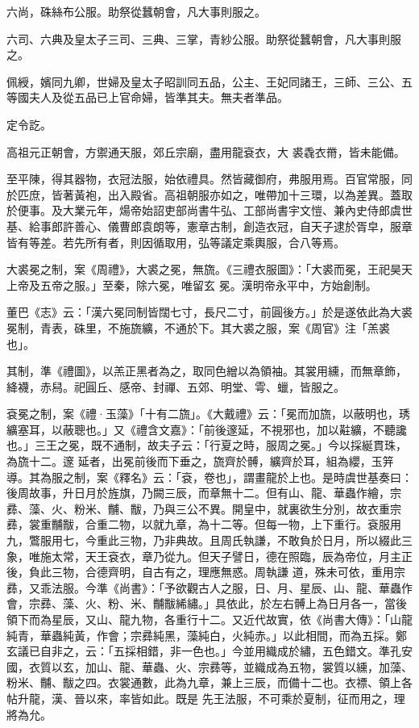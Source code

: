 \begin{pinyinscope}
 六尚，硃絲布公服。助祭從蠶朝會，凡大事則服之。



 六司、六典及皇太子三司、三典、三掌，青紗公服。助祭從蠶朝會，凡大事則服之。



 佩綬，嬪同九卿，世婦及皇太子昭訓同五品，公主、王妃同諸王，三師、三公、五等國夫人及從五品已上官命婦，皆準其夫。無夫者準品。



 定令訖。



 高祖元正朝會，方禦通天服，郊丘宗廟，盡用龍袞衣，大
 裘毳衣黹，皆未能備。



 至平陳，得其器物，衣冠法服，始依禮具。然皆藏御府，弗服用焉。百官常服，同於匹庶，皆著黃袍，出入殿省。高祖朝服亦如之，唯帶加十三環，以為差異。蓋取於便事。及大業元年，煬帝始詔吏部尚書牛弘、工部尚書宇文愷、兼內史侍郎虞世基、給事郎許善心、儀曹郎袁朗等，憲章古制，創造衣冠，自天子逮於胥皁，服章皆有等差。若先所有者，則因循取用，弘等議定乘輿服，合八等焉。



 大裘冕之制，案《周禮》，大裘之冕，無旒。《三禮衣服圖》：「大裘而冕，王祀昊天上帝及五帝之服。」至秦，除六冕，唯留玄
 冕。漢明帝永平中，方始創制。



 董巴《志》云：「漢六冕同制皆闊七寸，長尺二寸，前圓後方。」於是遂依此為大裘冕制，青表，硃里，不施旒纊，不通於下。其大裘之服，案《周官》注「羔裘也」。



 其制，準《禮圖》，以羔正黑者為之，取同色繒以為領袖。其裳用纁，而無章飾，絳襪，赤舄。祀圓丘、感帝、封禪、五郊、明堂、雩、蠟，皆服之。



 袞冕之制，案《禮·玉藻》「十有二旒」。《大戴禮》云：「冕而加旒，以蔽明也，琇纊塞耳，以蔽聰也。」又《禮含文嘉》：「前後邃延，不視邪也，加以黈纊，不聽讒也。」三王之冕，既不通制，故夫子云：「行夏之時，服周之冕。」今以採綖貫珠，為旒十二。邃
 延者，出冕前後而下垂之，旒齊於髆，纊齊於耳，組為纓，玉笄導。其為服之制，案《釋名》云：「袞，卷也」，謂畫龍於上也。是時虞世基奏曰：後周故事，升日月於旌旗，乃闕三辰，而章無十二。但有山、龍、華蟲作繪，宗彞、藻、火、粉米、黼、黻，乃與三公不異。開皇中，就裏欲生分別，故衣重宗彞，裳重黼黻，合重二物，以就九章，為十二等。但每一物，上下重行。袞服用九，鷩服用七，今重此三物，乃非典故。且周氏執謙，不敢負於日月，所以綴此三象，唯施太常，天王袞衣，章乃從九。但天子譬日，德在照臨，辰為帝位，月主正後，負此三物，合德齊明，自古有之，理應無惑。周執謙
 道，殊未可依，重用宗彞，又乖法服。今準《尚書》：「予欲觀古人之服，日、月、星辰、山、龍、華蟲作會，宗彞、藻、火、粉、米、黼黻絺繡。」具依此，於左右髆上為日月各一，當後領下而為星辰，又山、龍九物，各重行十二。又近代故實，依《尚書大傳》：「山龍純青，華蟲純黃，作會；宗彞純黑，藻純白，火純赤。」以此相間，而為五採。鄭玄議已自非之，云：「五採相錯，非一色也。」今並用織成於繡，五色錯文。準孔安國，衣質以玄，加山、龍、華蟲、火、宗彞等，並織成為五物，裳質以纁，加藻、粉米、黼、黻之四。衣裳通數，此為九章，兼上三辰，而備十二也。衣褾、領上各帖升龍，漢、晉以來，率皆如此。既是
 先王法服，不可乘於夏制，征而用之，理將為允。




\end{pinyinscope}
